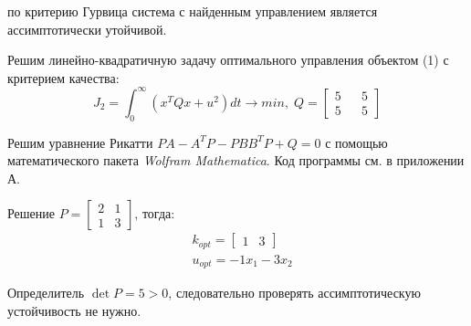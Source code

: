 \noindent по критерию Гурвица система с найденным управлением является ассимптотически утойчивой.


Решим линейно-квадратичную задачу оптимального управления объектом (1) с критерием качества:
$$
J_2=\int^{\infty}_0 (x^T Qx+u^2) dt \rightarrow min, \; Q = \begin{bmatrix}
    5 && 5 \\ 5 && 5
\end{bmatrix}
$$

Решим уравнение Рикатти $ PA - A^T P - PBB^T P + Q = 0 $ с помощью математического пакета \textit{Wolfram Mathematica}. Код программы см. в приложении А.

Решение $ P = \begin{bmatrix} 2 & 1 \\ 1 & 3 \end{bmatrix} $, тогда:
\begin{align*}
    &k_{opt} = \begin{bmatrix}
        1 & 3
    \end{bmatrix} \\
    &u_{opt} = -1x_1 -3x_2
\end{align*}

\noindent Определитель $ \det P = 5 > 0 $, следовательно проверять ассимптотическую устойчивость не нужно.
